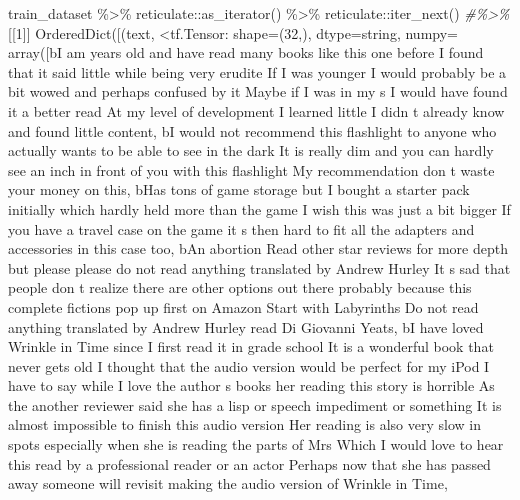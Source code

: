 \documentclass[
]{article}
\newenvironment{Shaded}{}{}
\newcommand{\AttributeTok}[1]{\textcolor[rgb]{0.49,0.56,0.16}{#1}}
\newcommand{\CommentTok}[1]{\textcolor[rgb]{0.38,0.63,0.69}{\textit{#1}}}
\newcommand{\DecValTok}[1]{\textcolor[rgb]{0.25,0.63,0.44}{#1}}
\newcommand{\FunctionTok}[1]{\textcolor[rgb]{0.02,0.16,0.49}{#1}}
\newcommand{\NormalTok}[1]{#1}
\newcommand{\SpecialCharTok}[1]{\textcolor[rgb]{0.25,0.44,0.63}{#1}}
\newcommand{\StringTok}[1]{\textcolor[rgb]{0.25,0.44,0.63}{#1}}
\begin{document}
\begin{Shaded}
\begin{Highlighting}[]
\NormalTok{train\_dataset }\SpecialCharTok{\%\textgreater{}\%}
\NormalTok{    reticulate}\SpecialCharTok{::}\FunctionTok{as\_iterator}\NormalTok{() }\SpecialCharTok{\%\textgreater{}\%}
\NormalTok{    reticulate}\SpecialCharTok{::}\FunctionTok{iter\_next}\NormalTok{()  }\CommentTok{\#\%\textgreater{}\% }
\NormalTok{[[}\DecValTok{1}\NormalTok{]]}
\FunctionTok{OrderedDict}\NormalTok{([(}\StringTok{\textquotesingle{}text\textquotesingle{}}\NormalTok{, }\SpecialCharTok{\textless{}}\NormalTok{tf.Tensor}\SpecialCharTok{:} \AttributeTok{shape=}\NormalTok{(}\DecValTok{32}\NormalTok{,), }\AttributeTok{dtype=}\NormalTok{string, }\AttributeTok{numpy=}
\FunctionTok{array}\NormalTok{([b}\StringTok{\textquotesingle{}I am years old and have read many books like this one before I found that it said little while being very erudite If I was younger I would probably be a bit wowed and perhaps confused by it Maybe if I was in my s I would have found it a better read At my level of development I learned little I didn t already know and found little content\textquotesingle{}}\NormalTok{,}
\NormalTok{       b}\StringTok{\textquotesingle{}I would not recommend this flashlight to anyone who actually wants to be able to see in the dark It is really dim and you can hardly see an inch in front of you with this flashlight My recommendation don t waste your money on this\textquotesingle{}}\NormalTok{,}
\NormalTok{       b}\StringTok{\textquotesingle{}Has tons of game storage but I bought a starter pack initially which hardly held more than the game I wish this was just a bit bigger If you have a travel case on the game it s then hard to fit all the adapters and accessories in this case too\textquotesingle{}}\NormalTok{,}
\NormalTok{       b}\StringTok{\textquotesingle{}An abortion Read other star reviews for more depth but please please do not read anything translated by Andrew Hurley It s sad that people don t realize there are other options out there probably because this complete fictions pop up first on Amazon Start with Labyrinths Do not read anything translated by Andrew Hurley read Di Giovanni Yeats\textquotesingle{}}\NormalTok{,}
\NormalTok{       b}\StringTok{\textquotesingle{}I have loved Wrinkle in Time since I first read it in grade school It is a wonderful book that never gets old I thought that the audio version would be perfect for my iPod I have to say while I love the author s books her reading this story is horrible As the another reviewer said she has a lisp or speech impediment or something It is almost impossible to finish this audio version Her reading is also very slow in spots especially when she is reading the parts of Mrs Which I would love to hear this read by a professional reader or an actor Perhaps now that she has passed away someone will revisit making the audio version of Wrinkle in Time\textquotesingle{}}\NormalTok{,}

\end{Highlighting}
\end{Shaded}
\end{document}
